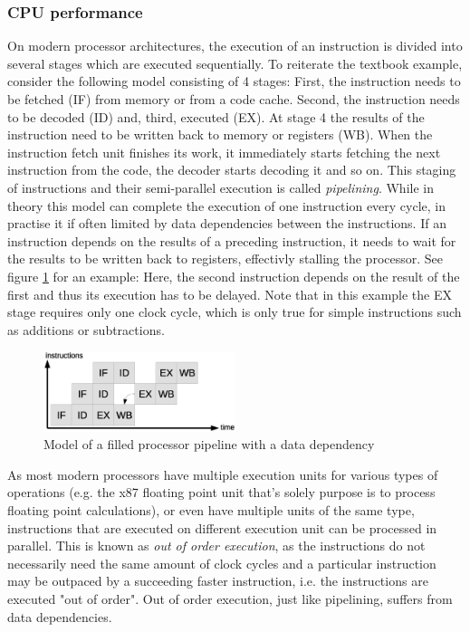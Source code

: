 \subsubsection{CPU performance}
On modern processor architectures, the execution of an instruction is divided into several stages which are executed sequentially. To reiterate the textbook example, consider the following model consisting of 4 stages: First, the instruction needs to be fetched (IF) from memory or from a code cache. Second, the instruction needs to be decoded (ID) and, third, executed (EX). At stage 4 the results of the instruction need to be written back to memory or registers (WB). When the instruction fetch unit finishes its work, it immediately starts fetching the next instruction from the code, the decoder starts decoding it and so on. This staging of instructions and their semi-parallel execution is called \emph{pipelining}. While in theory this model can complete the execution of one instruction every cycle, in practise it if often limited by data dependencies between the instructions. If an instruction depends on the results of a preceding instruction, it needs to wait for the results to be written back to registers, effectivly stalling the processor. See figure \ref{fig:pipeline} for an example: Here, the second instruction depends on the result of the first and thus its execution has to be delayed. Note that in this example the EX stage requires only one clock cycle, which is only true for simple instructions such as additions or subtractions.

\begin{figure}[h]
\begin{center}
\includegraphics[width=0.5\textwidth]{img/pipeline}
\end{center}
\caption{Model of a filled processor pipeline with a data dependency}
\label{fig:pipeline}
\end{figure}

As most modern processors have multiple execution units for various types of operations (e.g. the x87 floating point unit that's solely purpose is to process floating point calculations), or even have multiple units of the same type, instructions that are executed on different execution unit can be processed in parallel. This is known as \emph{out of order execution}, as the instructions do not necessarily need the same amount of clock cycles and a particular instruction may be outpaced by a succeeding faster instruction, i.e. the instructions are executed "out of order". Out of order execution, just like pipelining, suffers from data dependencies.

